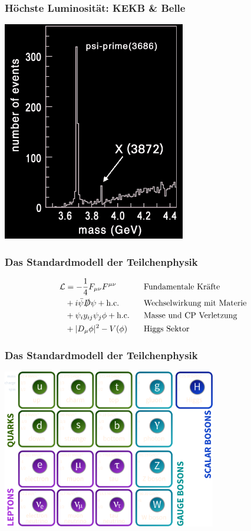 \documentclass[14pt]{beamer}
\begin{document}
\begin{frame}
	\frametitle{Höchste Luminosität: KEKB \& Belle}
	\begin{center}
		\includegraphics[width=0.6\textwidth]{belle.png}
	\end{center}
\end{frame}

\begin{frame}
	\frametitle{Das Standardmodell der Teilchenphysik}
		\begin{align*}
		\mathcal{L} &= -\frac{1}{4} F_{\mu\nu} F^{\mu\nu} & & \textrm{Fundamentale Kräfte}\\
		&+ i \bar{\psi} \slashed{D} \psi + \mathrm{h.c.} & & \textrm{Wechselwirkung mit Materie}\\
		&+ \psi_i y_{ij} \psi_j \phi + \mathrm{h.c.} & & \textrm{Masse und CP Verletzung}\\
		&+ |D_\mu \phi|^2 - V(\phi) \quad  & & \textrm{Higgs Sektor}
		\end{align*}
\end{frame}

\begin{frame}
	\frametitle{Das Standardmodell der Teilchenphysik}
	\begin{center}
		\includegraphics[width=0.7\textwidth]{particles.png}
	\end{center}
\end{frame}
\end{document}
